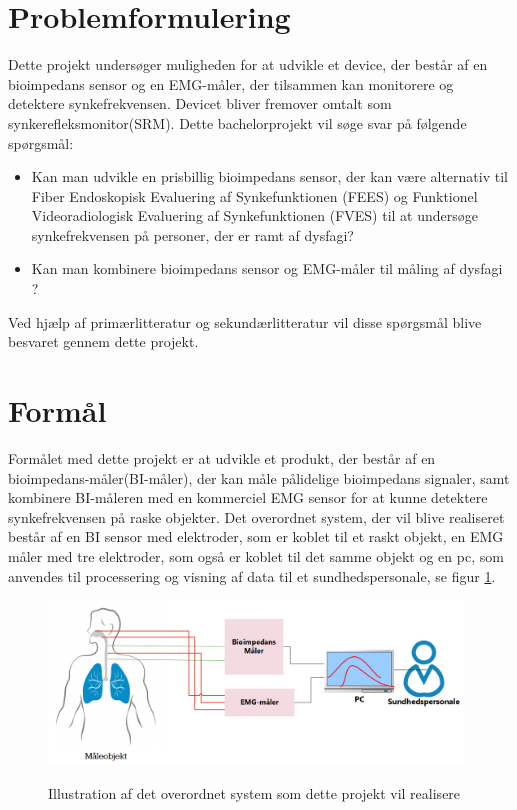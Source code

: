 \section{Problemformulering}

Dette projekt undersøger muligheden for at udvikle et device, der består af en bioimpedans sensor og en EMG-måler, der tilsammen kan monitorere og detektere synkefrekvensen. Devicet bliver fremover omtalt som synkerefleksmonitor(SRM). Dette bachelorprojekt vil søge svar på følgende spørgsmål: 

\begin{itemize}
\item Kan man udvikle en prisbillig bioimpedans sensor, der kan være alternativ til Fiber Endoskopisk Evaluering af Synkefunktionen (FEES) og Funktionel Videoradiologisk Evaluering af Synkefunktionen (FVES) til at undersøge synkefrekvensen på personer, der er ramt af dysfagi?
\item Kan man kombinere bioimpedans sensor og EMG-måler til måling af dysfagi ?


\end{itemize}
Ved hjælp af primærlitteratur og sekundærlitteratur vil disse spørgsmål blive besvaret gennem dette projekt. 

\section{Formål}

Formålet med dette projekt er at udvikle et produkt, der består af en bioimpedans-måler(BI-måler), der kan måle pålidelige bioimpedans signaler, samt kombinere BI-måleren med en kommerciel EMG sensor for at kunne detektere synkefrekvensen på raske objekter. Det overordnet system, der vil blive realiseret består af en BI sensor med elektroder, som er koblet til et raskt objekt, en EMG måler med tre elektroder, som også er koblet til det samme objekt og en pc, som anvendes til processering og visning af data til et sundhedspersonale, se figur \ref{KonceptuelDiagram}.  

\begin{figure}[H]
\centering
{\includegraphics[width=11cm]
{Figure/KonceptuelDiagram}}
\caption{Illustration af  det overordnet system som dette projekt vil realisere}
\label{KonceptuelDiagram}
\end{figure}

